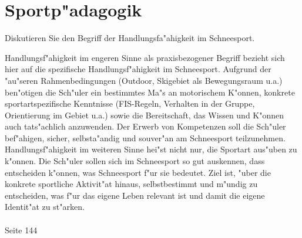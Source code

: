 \section{Sportp"adagogik}
\begin{question}{4}
Diskutieren Sie den Begriff der Handlungsfa"ahigkeit im Schneesport.
\end{question}
\begin{solution}
Handlungsf"ahigkeit im engeren Sinne als praxisbezogener Begriff bezieht sich hier auf die spezifische Handlungsf"ahigkeit im Schneesport. Aufgrund der "au"seren Rahmenbedingungen (Outdoor, Skigebiet als Bewegungsraum u.a.) ben"otigen die Sch"uler ein bestimmtes Ma"s an motorischem K"onnen, konkrete sportartspezifische Kenntnisse (FIS-Regeln, Verhalten in der Gruppe, Orientierung im Gebiet u.a.) sowie die Bereitschaft, das Wissen und K"onnen auch tats"achlich anzuwenden. Der Erwerb von Kompetenzen soll die Sch"uler bef"ahigen, sicher, selbsta"andig und souver"an am Schneesport teilzunehmen.\\
Handlungsf"ahigkeit im weiteren Sinne hei"st nicht nur, die Sportart aus"uben zu k"onnen. Die Sch"uler sollen sich im Schneesport so gut auskennen, dass entscheiden k"onnen, was Schneesport f"ur sie bedeutet. Ziel ist, "uber die konkrete sportliche Aktivit"at hinaus, selbstbestimmt und m"undig zu entscheiden, was f"ur das eigene Leben relevant ist und damit die eigene Identit"at zu st"arken.\\\\
 Seite 144
\end{solution}

